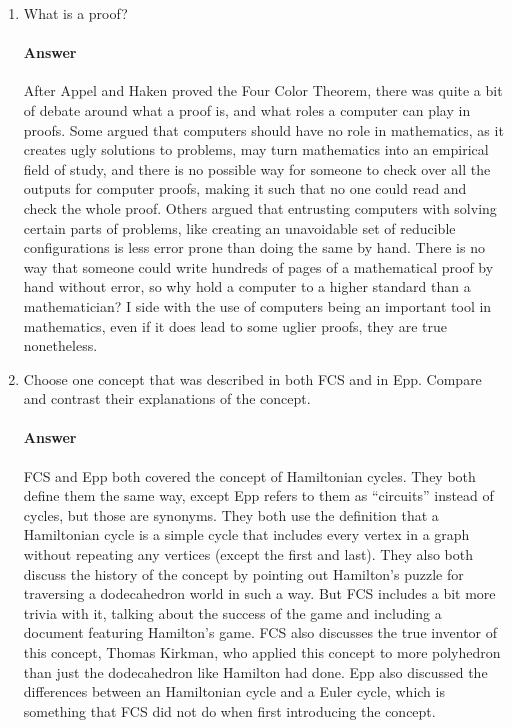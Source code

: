 \documentclass{article}
\begin{document}
\begin{enumerate}

    \item What is a proof?

        \paragraph{Answer}

       After Appel and Haken proved the Four Color Theorem, there was quite a bit of debate around what a proof is,
       and what roles a computer can play in proofs. Some argued that computers should have no role in mathematics,
       as it creates ugly solutions to problems, may turn mathematics into an empirical field of study, and there is no possible
       way for someone to check over all the outputs for computer proofs, making it such that no one could read and check the whole 
       proof. Others argued that entrusting computers with solving certain parts of problems, like creating an unavoidable set of reducible configurations
       is less error prone than doing the same by hand. There is no way that someone could write hundreds of pages of a mathematical proof by hand 
       without error, so why hold a computer to a higher standard than a mathematician? I side with the use of computers being an important tool in mathematics,
       even if it does lead to some uglier proofs, they are true nonetheless. 


    \item Choose one concept that was described in both FCS and in Epp.
        Compare and contrast their explanations of the concept.

        \paragraph{Answer}

        FCS and Epp both covered the concept of Hamiltonian cycles. They both define them the same way, except Epp refers to them as ``circuits'' instead of cycles, but those are synonyms. They both use the definition that a Hamiltonian cycle is a simple cycle that includes every vertex in a graph without repeating any vertices (except the first and last). They also both discuss the history of the concept by pointing out Hamilton's puzzle for traversing a dodecahedron world in such a way. But FCS includes a bit more trivia with it, talking about the success of the game and including a document featuring Hamilton's game. FCS also discusses the true inventor of this concept, Thomas Kirkman, who applied this concept to more polyhedron than just the dodecahedron like Hamilton had done. Epp also discussed the differences between an Hamiltonian cycle and a Euler cycle, which is something that FCS did not do when first introducing the concept.

\end{enumerate}
\end{document}
